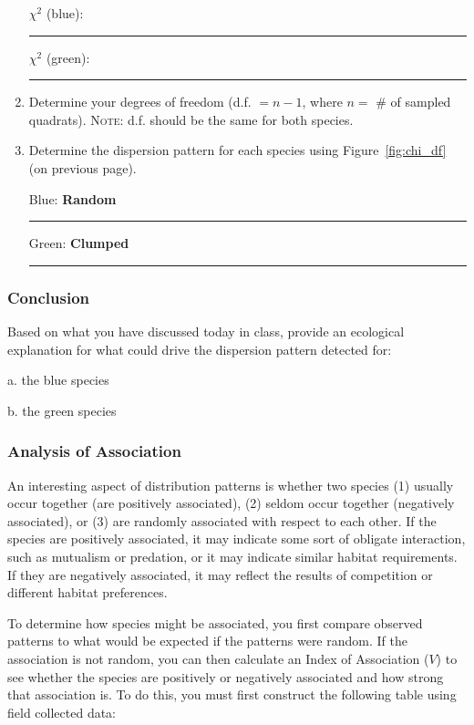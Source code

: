 \documentclass[12pt, hidelinks]{exam}
\newcommand\chisq{$\chi^2$}
\begin{document}
\begin{enumerate}
\chisq{} (blue): \rule{0.75in}{0.4pt} \qquad \chisq{} (green): \rule{0.75in}{0.4pt}


\item Determine your degrees of freedom (d.f. $= n-1$, where $n =$ \# of sampled
quadrats). \textsc{Note:} d.f. should be the same for both species.

\item Determine the dispersion pattern for each species using Figure~\ref{fig:chi_df} (on
previous page).

\vspace*{\baselineskip}


Blue: \ifprintanswers\textbf{Random}\else\rule{1.5in}{0.4pt}\fi \qquad Green: \ifprintanswers\textbf{Clumped}\else\rule{1.5in}{0.4pt}\fi

\end{enumerate}

\subsubsection*{Conclusion}

Based on what you have discussed today in class, provide an ecological
explanation for what could drive the dispersion pattern detected for:

a. the blue species \vspace*{3\baselineskip}

b. the green species \vspace*{2\baselineskip}

\subsubsection*{Analysis of Association}

An interesting aspect of distribution patterns is whether two
species (1) usually occur together (are positively associated), (2)
seldom occur together (negatively associated), or (3) are randomly
associated with respect to each other. If the species are positively
associated, it may indicate some sort of obligate interaction, such as
mutualism or predation, or it may indicate similar habitat
requirements. If they are negatively associated, it may reflect the
results of competition or different habitat preferences.

To determine how species might be associated, you first compare observed
patterns to what would be expected if the patterns were random. If the association is not
random, you can then calculate an Index of Association ($V$) to see whether
the species are positively or negatively associated and how strong that
association is. To do this, you must first construct the following table
using field collected data:
\end{document}
